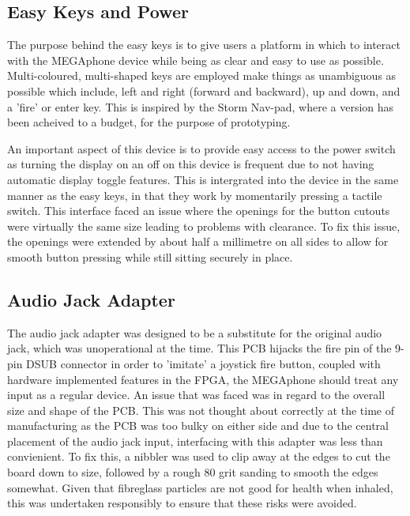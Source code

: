 \subsection{Easy Keys and Power}

The purpose behind the easy keys is to give users a platform in which to interact with the MEGAphone device while being as clear and easy to use as possible.
Multi-coloured, multi-shaped keys are employed make things as unambiguous as possible which include, left and right (forward and backward), up and down, and a 'fire' or enter key.
This is inspired by the Storm Nav-pad, where a version has been acheived to a budget, for the purpose of prototyping.

An important aspect of this device is to provide easy access to the power switch as turning the display on an off on this device is frequent due to not having automatic display toggle features.
This is intergrated into the device in the same manner as the easy keys, in that they work by momentarily pressing a tactile switch.
This interface faced an issue where the openings for the button cutouts were virtually the same size leading to problems with clearance. 
To fix this issue, the openings were extended by about half a millimetre on all sides to allow for smooth button pressing while still sitting securely in place.

\subsection{Audio Jack Adapter}

The audio jack adapter was designed to be a substitute for the original audio jack, which was unoperational at the time.
This PCB hijacks the fire pin of the 9-pin DSUB connector in order to 'imitate' a joystick fire button, coupled with hardware implemented features in the FPGA, the MEGAphone should treat any input as a regular device.
An issue that was faced was in regard to the overall size and shape of the PCB.
This was not thought about correctly at the time of manufacturing as the PCB was too bulky on either side and due to the central placement of the audio jack input, interfacing with this adapter was less than convienient.
To fix this, a nibbler was used to clip away at the edges to cut the board down to size, followed by a rough 80 grit sanding to smooth the edges somewhat.
Given that fibreglass particles are not good for health when inhaled, this was undertaken responsibly to ensure that these risks were avoided.

